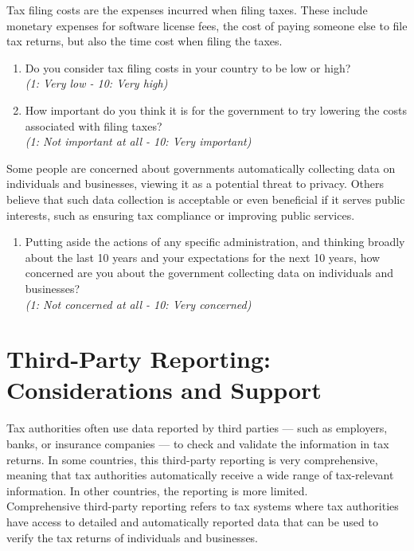 \documentclass[11pt]{article}
\begin{document}
Tax filing costs are the expenses incurred when filing taxes. These include monetary expenses for software license fees, the cost of paying someone else to file tax returns, but also the time cost when filing the taxes. 
\begin{enumerate}[resume]
    \item Do you consider tax filing costs in your country to be low or high?   \\ \textit{(1: Very low - 10: Very high)}
    \item How important do you think it is for the government to try lowering the costs associated with filing taxes? \\ \textit{(1: Not important at all - 10: Very important)}
\end{enumerate}
Some people are concerned about governments automatically collecting data on individuals and businesses, viewing it as a potential threat to privacy. Others believe that such data collection is acceptable or even beneficial if it serves public interests, such as ensuring tax compliance or improving public services.
\begin{enumerate}[resume]
    \item Putting aside the actions of any specific administration, and thinking broadly about the last 10 years and your expectations for the next 10 years, how concerned are you about the government collecting data on individuals and businesses?\\
    \textit{(1: Not concerned at all - 10: Very concerned)}
\end{enumerate}

\section*{Third-Party Reporting: Considerations and Support}
Tax authorities often use data reported by third parties — such as employers, banks, or insurance companies — to check and validate the information in tax returns. In some countries, this third-party reporting is very comprehensive, meaning that tax authorities automatically receive a wide range of tax-relevant information. In other countries, the reporting is more limited.\\

\noindent Comprehensive third-party reporting refers to tax systems where tax authorities have access to detailed and automatically reported data that can be used to verify the tax returns of individuals and businesses.\\
\end{document}
